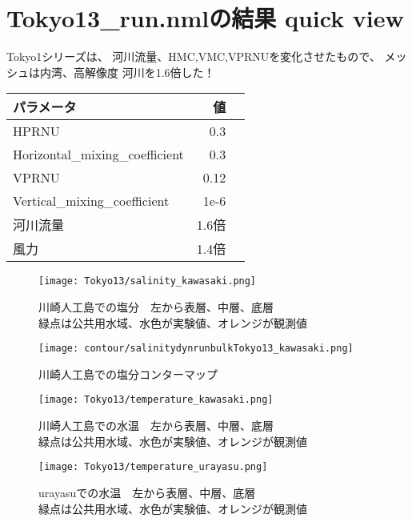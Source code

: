 \documentclass[fontsize=12pt,paper=a4]{jlreq}
\begin{document}
\section{Tokyo13\_run.nmlの結果 quick view}
Tokyo1シリーズは、 河川流量、HMC,VMC,VPRNUを変化させたもので、
メッシュは内湾、高解像度
河川を1.6倍した！
\begin{table}
  \begin{minipage}[hbtp]{0.5\hsize}
    \begin{tabular}{lrr} \toprule
      パラメータ & 値 \\ \midrule
      HPRNU & 0.3\\
      Horizontal\_mixing\_coefficient & 0.3\\
      VPRNU & 0.12\\
      Vertical\_mixing\_coefficient & 1e-6\\
      河川流量 & 1.6倍 \\
      風力 & 1.4倍\\ \bottomrule
    \end{tabular}
  \end{minipage}
\end{table}

\begin{figure}[hbtp]
        \centering
        \texttt{[image: Tokyo13/salinity\_kawasaki.png]}
        \caption{川崎人工島での塩分　左から表層、中層、底層\\緑点は公共用水域、水色が実験値、オレンジが観測値}
\end{figure}

\begin{figure}[hbtp]
        \centering
        \texttt{[image: contour/salinitydynrunbulkTokyo13\_kawasaki.png]}
        \caption{川崎人工島での塩分コンターマップ}
\end{figure}


\begin{figure}[hbtp]
        \centering
        \texttt{[image: Tokyo13/temperature\_kawasaki.png]}
        \caption{川崎人工島での水温　左から表層、中層、底層\\緑点は公共用水域、水色が実験値、オレンジが観測値}
\end{figure}
\begin{figure}[hbtp]
  \centering
  \texttt{[image: Tokyo13/temperature\_urayasu.png]}
  \caption{urayasuでの水温　左から表層、中層、底層\\緑点は公共用水域、水色が実験値、オレンジが観測値}
\end{figure}
\end{document}

